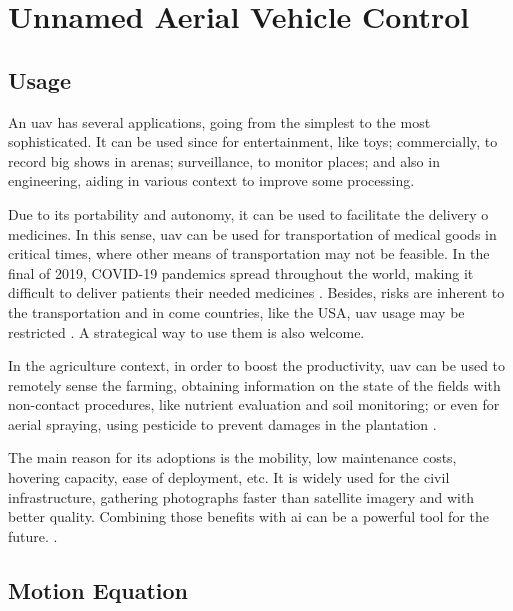 \section{Unnamed Aerial Vehicle Control}

\subsection{Usage}

An \gls*{uav} has several applications, going from the simplest to the most sophisticated. It can be used since for entertainment, like toys; commercially, to record big shows in arenas; surveillance, to monitor places; and also in engineering, aiding in various context to improve some processing.

Due to its portability and autonomy, it can be used to facilitate the delivery o medicines. In this sense, \gls*{uav} can be used for transportation of medical goods in critical times, where other means of transportation may not be feasible.
In the final of 2019, COVID-19 pandemics spread throughout the world, making it difficult to deliver patients their needed medicines \cite{ramakrishnan2023,mcphillips2022}.
Besides, risks are inherent to the transportation and in come countries, like the USA, \gls*{uav} usage may be restricted \citep{thiels2015}. 
A strategical way to use them is also welcome.

In the agriculture context, in order to boost the productivity, \gls*{uav} can be used to remotely sense the farming, obtaining information on the state of the fields with non-contact procedures, like nutrient evaluation and soil monitoring; or even for aerial spraying, using pesticide to prevent damages in the plantation \citep{delcerro2021}.

The main reason for its adoptions is the mobility, low maintenance costs, hovering capacity, ease of deployment, etc. 
It is widely used for the civil infrastructure, gathering photographs faster than  satellite imagery and with better quality. 
Combining those benefits with \gls*{ai} can be a powerful tool for the future. \citet{sivakumar2021}. 

\subsection{Motion Equation}

